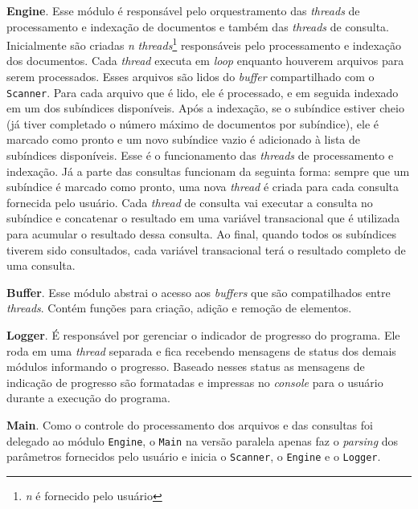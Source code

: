 \textbf{Engine}. Esse módulo é responsável pelo orquestramento das \emph{threads} de processamento e indexação de documentos e também das \emph{threads} de consulta. Inicialmente são criadas \emph{n} \emph{threads}\footnote{\emph{n} é fornecido pelo usuário} responsáveis pelo processamento e indexação dos documentos. Cada \emph{thread} executa em \emph{loop} enquanto houverem arquivos para serem processados. Esses arquivos são lidos do \emph{buffer} compartilhado com o \verb|Scanner|. Para cada arquivo que é lido, ele é processado, e em seguida indexado em um dos subíndices disponíveis. Após a indexação, se o subíndice estiver cheio (já tiver completado o número máximo de documentos por subíndice), ele é marcado como pronto e um novo subíndice vazio é adicionado à lista de subíndices disponíveis. Esse é o funcionamento das \emph{threads} de processamento e indexação. Já a parte das consultas funcionam da seguinta forma: sempre que um subíndice é marcado como pronto, uma nova \emph{thread} é criada para cada consulta fornecida pelo usuário. Cada \emph{thread} de consulta vai executar a consulta no subíndice e concatenar o resultado em uma variável transacional que é utilizada para acumular o resultado dessa consulta. Ao final, quando todos os subíndices tiverem sido consultados, cada variável transacional terá o resultado completo de uma consulta.

\textbf{Buffer}. Esse módulo abstrai o acesso aos \emph{buffers} que são compatilhados entre \emph{threads}. Contém funções para criação, adição e remoção de elementos.

\textbf{Logger}. É responsável por gerenciar o indicador de progresso do programa. Ele roda em uma \emph{thread} separada e fica recebendo mensagens de status dos demais módulos informando o progresso. Baseado nesses status as mensagens de indicação de progresso são formatadas e impressas no \emph{console} para o usuário durante a execução do programa.

\textbf{Main}. Como o controle do processamento dos arquivos e das consultas foi delegado ao módulo \verb|Engine|, o \verb|Main| na versão paralela apenas faz o \emph{parsing} dos parâmetros fornecidos pelo usuário e inicia o \verb|Scanner|, o \verb|Engine| e o \verb|Logger|.